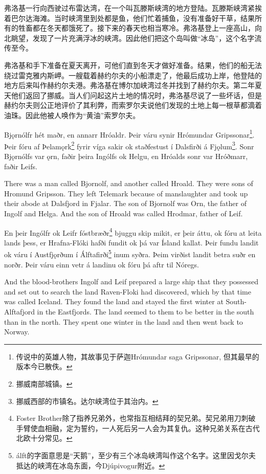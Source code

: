 \begin{translation*}{}
    弗洛基一行向西驶过布雷达湾，在一个叫瓦滕斯峡湾的地方登陆。瓦滕斯峡湾紧挨着巴尔达海滩。当时峡湾里到处都是鱼，他们忙着捕鱼，没有准备好干草，结果所有的牲畜都在冬天都饿死了。接下来的春天也相当寒冷。弗洛基登上一座高山，向北眺望，发现了一片充满浮冰的峡湾。因此他们把这个岛叫做“冰岛”，这个名字流传至今。

    弗洛基和手下准备在夏天离开，可他们直到冬天才做好准备。结果，他们的船无法绕过雷克雅内斯岬。一艘载着赫约尔夫的小船漂走了，他最后成功上岸，他登陆的地方后来叫作赫约尔夫港。弗洛基在博尔加峡湾过冬并找到了赫约尔夫。第二年夏天他们返回了挪威。当人们问起这片土地的情况时，弗洛基尽说了一些坏话，但是赫约尔夫则公正地评价了其利弊，而索罗尔夫说他们发现的土地上每一根草都滴着油珠。因此他被人唤作为“黄油”索罗尔夫。
\end{translation*}

\begin{paracol}{2}
    Bjǫrnólfr hét maðr, en annarr Hróaldr. Þeir váru synir Hrómundar Gripssonar\footnote{传说中的英雄人物，其故事见于萨迦Hrómundar saga Gripssonar, 但其最早的版本今已散佚。}. Þeir fóru af Þelamǫrk\footnote{挪威南部城镇。} fyrir víga sakir ok staðfestust í Dalsfirði á Fjǫlum\footnote{挪威西部的市镇名。达尔峡湾位于其治内。}. Sonr Bjǫrnólfs var ǫrn, faðir þeira Ingólfs ok Helgu, en Hróalds sonr var Hróðmarr, faðir Leifs.
    \switchcolumn

    There was a man called Bjornolf, and another called Hroald. They were sons of Hromund Gripsson. They left Telemark because of manslaughter and took up their abode at Dalsfjord in Fjalar. The son of Bjornolf was Orn, the father of Ingolf and Helga. And the son of Hroald was called Hrodmar, father of Leif.
\end{paracol}

\begin{paracol}{2}
    En þeir Ingólfr ok Leifr fóstbræðr\footnote{Foster Brother除了指养兄弟外，也常指互相结拜的契兄弟。契兄弟用刀刺破手臂使血相融，定为誓约，一人死后另一人会为其复仇。这种兄弟关系在古代北欧十分常见。} bjuggu skip mikit, er þeir áttu, ok fóru at leita lands þess, er Hrafna-Flóki hafði fundit ok þá var Ísland kallat. Þeir fundu landit ok váru í Austfjǫrðum í Álftafirði\footnote{álft的字面意思是“天鹅”，至少有三个冰岛峡湾叫作这个名字。这里因戈尔夫抵达的峡湾在冰岛东面，今Djúpivogur附近。} inum syðra. Þeim virðist landit betra suðr en norðr. Þeir váru einn vetr á landinu ok fóru þá aftr til Nóregs.
    \switchcolumn

    And the blood-brothers Ingolf and Leif prepared a large ship that they possessed and set out to search the land Raven-Floki had discovered, which by that time was called Iceland. They found the land and stayed the first winter at South-Alftafjord in the Eastfjords. The land seemed to them to be better in the south than in the north. They spent one winter in the land and then went back to Norway.
\end{paracol}

